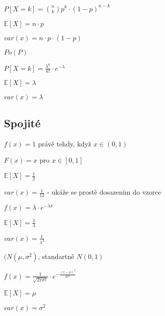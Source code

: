 \documentclass[a4paper,10pt,titlepage]{article} \usepackage[utf8]{inputenc}
\begin{document}
$P[X=k] = \binom{n}{k} p^k \cdot (1-p)^{n-k}$

$\mathbb{E}[X] = n\cdot p$

$var(x) = n \cdot p \cdot (1-p)$

{}

$Po(P)$ 

$P[X=k] = \frac{\lambda ^k}{k!} \cdot e^{-\lambda}$

$\mathbb{E}[X] = \lambda$

$var(x) =\lambda$

\subsection{Spojité}

{}

$f(x) = 1$ právě tehdy, když $x \in (0,1)$

$F(x) = x$ pro $x \in [0,1]$

$\mathbb{E}[X] = \frac{1}{2}$

$var(x) = \frac{1}{12}$ - ukáže se prostě dosazením do vzorce

\medskip

{}

$f(x) = \lambda \cdot e^{-\lambda x}$

$\mathbb{E}[X] = \frac{1}{\lambda}$

$var(x) = \frac{1}{\lambda^2}$

{}
$(N(\mu , \sigma ^2)$, standartně $N(0,1)$

$f(x) = \frac{1}{\sqrt{2 \pi \sigma ^2}} \cdot e^{-\frac{(x-\mu )^2}{2 \sigma ^2}}$

$\mathbb{E}[X] = \mu$

$var(x) = \sigma ^2$
\end{document}
